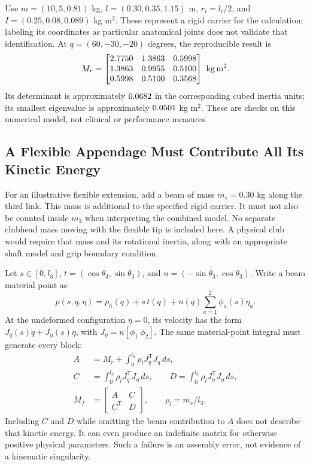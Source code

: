 Use $m=(10,5,0.81)$ kg, $l=(0.30,0.35,1.15)$ m, $r_i=l_i/2$, and $I=(0.25,0.08,0.089)$ kg m$^2$. These represent a rigid carrier for the calculation; labeling its coordinates as particular anatomical joints does not validate that identification. At $q=(60,-30,-20)$ degrees, the reproducible result is
\begin{equation}
 M_r=\begin{bmatrix}\cheightMqq\end{bmatrix}\ \mathrm{kg\,m^2}.
\end{equation}
Its determinant is approximately $0.0682$ in the corresponding cubed inertia units; its smallest eigenvalue is approximately $0.0501$ kg m$^2$. These are checks on this numerical model, not clinical or performance measures.

\subsection{A Flexible Appendage Must Contribute All Its Kinetic Energy}

For an illustrative flexible extension, add a beam of mass $m_s=0.30$ kg along the third link. This mass is additional to the specified rigid carrier. It must not also be counted inside $m_3$ when interpreting the combined model. No separate clubhead mass moving with the flexible tip is included here. A physical club would require that mass and its rotational inertia, along with an appropriate shaft model and grip boundary condition.

Let $s\in[0,l_3]$, $t=(\cos\theta_3,\sin\theta_3)$, and $n=(-\sin\theta_3,\cos\theta_3)$. Write a beam material point as
\begin{equation}
 p(s,q,\eta)=p_h(q)+s\,t(q)+n(q)\sum_{a=1}^2\phi_a(s)\eta_a.
\end{equation}
At the undeformed configuration $\eta=0$, its velocity has the form $J_q(s)\dot q+J_\eta(s)\dot\eta$, with $J_\eta=n[\phi_1\ \phi_2]$. The same material-point integral must generate every block:
\begin{equation}
\begin{aligned}
 A&=M_r+\int_0^{l_3}\rho_l J_q^{\mathsf T}J_q\,ds,\\
 C&=\int_0^{l_3}\rho_l J_q^{\mathsf T}J_\eta\,ds,\qquad
 D=\int_0^{l_3}\rho_l J_\eta^{\mathsf T}J_\eta\,ds,\\
 M_f&=\begin{bmatrix}A&C\\C^{\mathsf T}&D\end{bmatrix},\qquad \rho_l=m_s/l_3.
\end{aligned}
\end{equation}
Including $C$ and $D$ while omitting the beam contribution to $A$ does not describe that kinetic energy. It can even produce an indefinite matrix for otherwise positive physical parameters. Such a failure is an assembly error, not evidence of a kinematic singularity.

